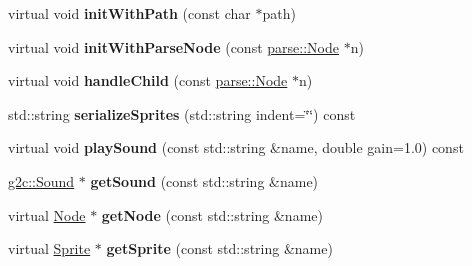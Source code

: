 \begin{DoxyCompactItemize}
\item 
\hypertarget{classg2c_1_1_world_abec479405f41fb409e45f2f3f95221d5}{
virtual void {\bfseries initWithPath} (const char $\ast$path)}
\label{classg2c_1_1_world_abec479405f41fb409e45f2f3f95221d5}

\item 
\hypertarget{classg2c_1_1_world_a7573e885cda4e30031b3efdf11e2e80a}{
virtual void {\bfseries initWithParseNode} (const \hyperlink{classparse_1_1_node}{parse::Node} $\ast$n)}
\label{classg2c_1_1_world_a7573e885cda4e30031b3efdf11e2e80a}

\item 
\hypertarget{classg2c_1_1_world_ab6736c233042a5075eaa7e9b3b62bc3a}{
virtual void {\bfseries handleChild} (const \hyperlink{classparse_1_1_node}{parse::Node} $\ast$n)}
\label{classg2c_1_1_world_ab6736c233042a5075eaa7e9b3b62bc3a}

\item 
\hypertarget{classg2c_1_1_world_ab4f21ff26324de94bad4b69002ed0f42}{
std::string {\bfseries serializeSprites} (std::string indent=\char`\"{}\char`\"{}) const }
\label{classg2c_1_1_world_ab4f21ff26324de94bad4b69002ed0f42}

\item 
\hypertarget{classg2c_1_1_world_accf3c96d6ce3c756a5df81d2ff207781}{
virtual void {\bfseries playSound} (const std::string \&name, double gain=1.0) const }
\label{classg2c_1_1_world_accf3c96d6ce3c756a5df81d2ff207781}

\item 
\hypertarget{classg2c_1_1_world_a76eda32d784c0cca606a19bb3765c956}{
\hyperlink{classg2c_1_1_sound}{g2c::Sound} $\ast$ {\bfseries getSound} (const std::string \&name)}
\label{classg2c_1_1_world_a76eda32d784c0cca606a19bb3765c956}

\item 
\hypertarget{classg2c_1_1_world_ad98f5d279d3aa9b8eaedef6f376703ff}{
virtual \hyperlink{classg2c_1_1_node}{Node} $\ast$ {\bfseries getNode} (const std::string \&name)}
\label{classg2c_1_1_world_ad98f5d279d3aa9b8eaedef6f376703ff}

\item 
\hypertarget{classg2c_1_1_world_ac278006c08abb3a26fe066d67029194e}{
virtual \hyperlink{classg2c_1_1_sprite}{Sprite} $\ast$ {\bfseries getSprite} (const std::string \&name)}
\label{classg2c_1_1_world_ac278006c08abb3a26fe066d67029194e}

\end{DoxyCompactItemize}
